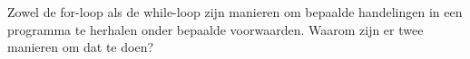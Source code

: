 Zowel de for-loop als de while-loop zijn manieren om bepaalde handelingen in een programma te herhalen onder bepaalde voorwaarden. Waarom zijn er twee manieren om dat te doen?
